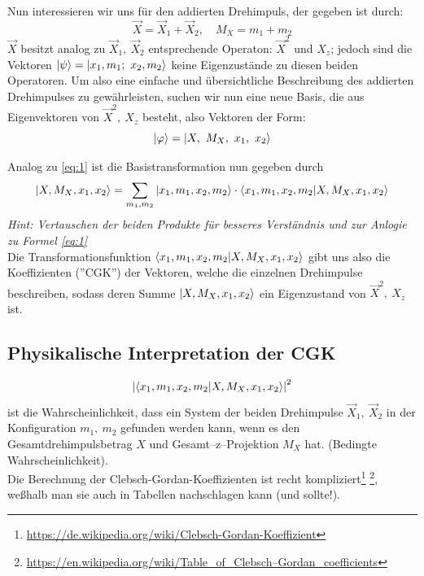 \documentclass[Ex4_Zusammenfassung.tex]{subfiles}
\begin{document}
Nun interessieren wir uns für den addierten Drehimpuls, der gegeben ist durch:
\begin{equation}
	\vec{X} = \vec{X}_1 + \vec{X}_2, \quad M_X = m_1 + m_2
\end{equation}
$\vec{X}$ besitzt analog zu $\vec{X}_1,\ \vec{X}_2$ entsprechende Operaton: $\vec{X}^2$ und $X_z$; jedoch sind die Vektoren $\ket{\psi} = \ket{x_1, m_1;\ x_2, m_2}$ keine Eigenzustände zu diesen beiden Operatoren. Um also eine einfache und übersichtliche Beschreibung des addierten Drehimpulses zu gewährleisten, suchen wir nun eine neue Basis, die aus Eigenvektoren von $\vec{X}^2,\ X_z$ besteht, also Vektoren der Form:
\begin{equation}
	\ket{\varphi} = \ket{X,\ M_X,\ x_1,\ x_2}
\end{equation}

Analog zu \ref{eq:1} ist die Basistransformation nun gegeben durch
\begin{equation}
	\ket{X, M_X, x_1, x_2} =\sum_{m_1,m_2} \ket{x_1, m_1, x_2, m_2} \cdot \braket{x_1, m_1, x_2,m_2|X, M_X, x_1, x_2}
\end{equation}
\textit{Hint: Vertauschen der beiden Produkte für besseres Verständnis und zur Anlogie zu Formel \ref{eq:1}}\\

Die Transformationsfunktion $\braket{x_1, m_1, x_2,m_2|X, M_X, x_1, x_2}$ gibt uns also die Koeffizienten (''CGK'') der Vektoren, welche die einzelnen Drehimpulse beschreiben, sodass deren Summe $\ket{X, M_X, x_1, x_2}$ ein Eigenzustand von $\vec{X}^2,\ X_z$ ist. 

\subsection*{Physikalische Interpretation der CGK}
\begin{equation}
	\left\vert \braket{x_1, m_1, x_2,m_2|X, M_X, x_1, x_2} \right\vert^2
\end{equation}
ist die Wahrscheinlichkeit, dass ein System der beiden Drehimpulse $\vec{X}_1,\ \vec{X}_2$ in der Konfiguration $m_1,\ m_2$ gefunden werden kann, wenn es den Gesamtdrehimpulsbetrag $X$ und Gesamt--z--Projektion $M_X$ hat. (Bedingte Wahrscheinlichkeit).\\

Die Berechnung der Clebsch-Gordan-Koeffizienten ist recht kompliziert\footnote{\href{https://de.wikipedia.org/wiki/Clebsch-Gordan-Koeffizient}{https://de.wikipedia.org/wiki/Clebsch-Gordan-Koeffizient}} \footnote{\href{https://en.wikipedia.org/wiki/Table_of_Clebsch–Gordan_coefficients}{https://en.wikipedia.org/wiki/Table\_of\_Clebsch–Gordan\_coefficients}}, weßhalb man sie auch in Tabellen nachschlagen kann (und sollte!).
\end{document}
